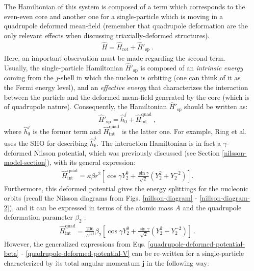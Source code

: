 The Hamiltonian of this system is composed of a term which corresponds to the even-even core and another one for a single-particle which is moving in a quadrupole deformed mean-field (remember that quadrupole deformation are the only relevant effects when discussing triaxially-deformed structures).
\begin{align}
    \hat{H}=\hat{H}_\text{rot}+\hat{H}'_\text{sp}\ .
    \label{triaxial-prm-general-hamiltonian}
\end{align}
Here, an important observation must be made regarding the second term. Usually, the single-particle Hamiltonian $\hat{H}'_\text{sp}$ is composed of an \emph{intrinsic energy} coming from the $j$-shell in which the nucleon is orbiting (one can think of it as the Fermi energy level), and an \emph{effective energy} that characterizes the interaction between the particle and the deformed mean-field generated by the core (which is of quadrupole nature). Consequently, the Hamiltonian $\hat{H}'_\text{sp}$ should be written as: $$\hat{H}'_\text{sp}=\hat{h}_0^j+\hat{H}_\text{int}^\text{quad}\ ,$$where $\hat{h}_0^j$ is the former term and $\hat{H}_\text{int}^\text{quad}$ is the latter one.
For example, Ring et al. \cite{ring2004nuclear} uses the SHO for describing $\hat{h}_0^j$. The interaction Hamiltonian is in fact a $\gamma$-deformed Nilsson potential, which was previously discussed (see Section \ref{nilsson-model-section}), with its general expression:
\begin{align}
    \hat{H}_\text{int}^\text{quad}=\kappa\beta r^2\left[\cos\gamma Y_{2}^{0}+\frac{\sin\gamma}{\sqrt{2}}\left(Y_2^2+Y_2^{-2}\right)\right].
    \label{quadrupole-deformed-potential-beta}
\end{align}
Furthermore, this deformed potential gives the energy splittings for the nucleonic orbits (recall the Nilsson diagrams from Figs. \ref{nillson-diagram} - \ref{nillson-diagram-2}), and it can be expressed in terms of the atomic mass $A$ and the quadrupole deformation parameter $\beta_2$ \cite{peng2003description}:
\begin{align}
    \hat{H}_\text{int}^\text{quad}=\frac{206}{A^{1/3}}\beta_2\left[\cos\gamma Y_2^0+\frac{\sin\gamma}{\sqrt{2}}(Y_2^2+Y_2^{-2})\right]\ .
    \label{quadrupole-deformed-potential-V}
\end{align}
However, the generalized expressions from Eqs. \ref{quadrupole-deformed-potential-beta} - \ref{quadrupole-deformed-potential-V} can be re-written for a single-particle characterized by its total angular momentum $\mathbf{j}$ in the following way:
